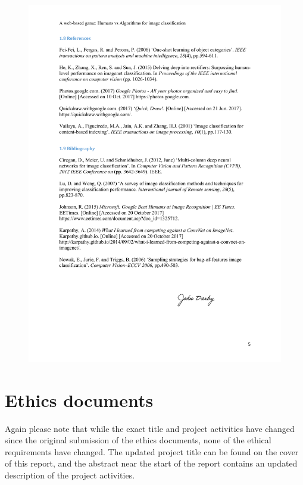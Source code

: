 \documentclass[a4paper,12pt]{report}
\begin{document}
\begin{appendices}
    \begin{figure}[h]
      \centering
      \includegraphics[scale=0.8]{tor-5}
    \end{figure}

  \chapter{Ethics documents}
    Again please note that while the exact title and project activities have changed since the original submission of the ethics documents, none of the ethical requirements have changed. The updated project title can be found on the cover of this report, and the abstract near the start of the report contains an updated description of the project activities.


\end{appendices}
\end{document}
